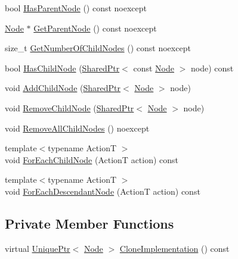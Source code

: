\begin{DoxyCompactItemize}
\item 
bool \hyperlink{classmage_1_1_node_acc47eb0f2eaa60e71fd945e79b4f622d}{Has\+Parent\+Node} () const noexcept
\item 
\hyperlink{classmage_1_1_node}{Node} $\ast$ \hyperlink{classmage_1_1_node_a21ba704ed3af4c80d096ad5f393da8e0}{Get\+Parent\+Node} () const noexcept
\item 
size\+\_\+t \hyperlink{classmage_1_1_node_ab4fff9779c09d873abcf881b6ff85d9e}{Get\+Number\+Of\+Child\+Nodes} () const noexcept
\item 
bool \hyperlink{classmage_1_1_node_a1b8c2d933a281f7f815791db38c965ad}{Has\+Child\+Node} (\hyperlink{namespacemage_a1e01ae66713838a7a67d30e44c67703e}{Shared\+Ptr}$<$ const \hyperlink{classmage_1_1_node}{Node} $>$ node) const
\item 
void \hyperlink{classmage_1_1_node_a11a7c052c5e4a6713d60aaad67dfde5d}{Add\+Child\+Node} (\hyperlink{namespacemage_a1e01ae66713838a7a67d30e44c67703e}{Shared\+Ptr}$<$ \hyperlink{classmage_1_1_node}{Node} $>$ node)
\item 
void \hyperlink{classmage_1_1_node_a0da235c6459c315ad1c4be5c7aa7c7f0}{Remove\+Child\+Node} (\hyperlink{namespacemage_a1e01ae66713838a7a67d30e44c67703e}{Shared\+Ptr}$<$ \hyperlink{classmage_1_1_node}{Node} $>$ node)
\item 
void \hyperlink{classmage_1_1_node_a7627e4e280fc9dd13d255c0f64eba79e}{Remove\+All\+Child\+Nodes} () noexcept
\item 
{\footnotesize template$<$typename ActionT $>$ }\\void \hyperlink{classmage_1_1_node_afedb523a462952ec29aed7504d0a71d4}{For\+Each\+Child\+Node} (ActionT action) const
\item 
{\footnotesize template$<$typename ActionT $>$ }\\void \hyperlink{classmage_1_1_node_a86668c371e1452204b52f2896cbb16fd}{For\+Each\+Descendant\+Node} (ActionT action) const
\end{DoxyCompactItemize}
\subsection*{Private Member Functions}
\begin{DoxyCompactItemize}
\item 
virtual \hyperlink{namespacemage_a8c307fbcc33bce9b7f2aa4c26c3b95cf}{Unique\+Ptr}$<$ \hyperlink{classmage_1_1_node}{Node} $>$ \hyperlink{classmage_1_1_node_a71a4763bfd4cba5653488b490e61dc8f}{Clone\+Implementation} () const
\end{DoxyCompactItemize}
